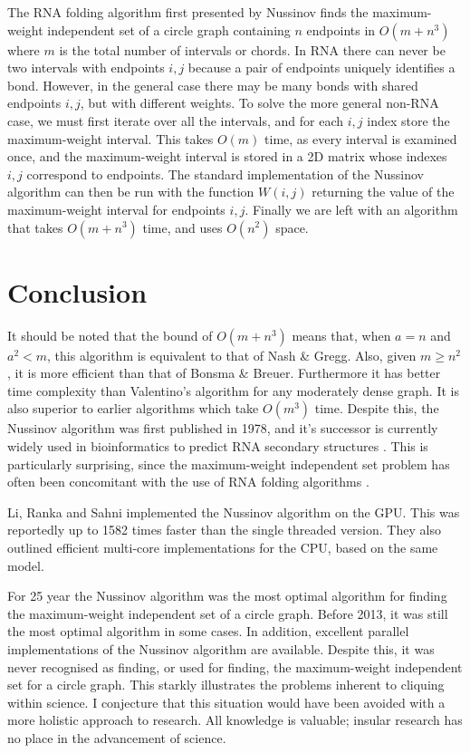 \documentclass[12pt, a4paper]{article}
\begin{document}
The RNA folding algorithm first presented by Nussinov finds the maximum-weight independent set of a circle graph containing $n$ endpoints in $O(m + n^3)$ where $m$ is the total number of intervals or chords. In RNA there can never be two intervals with endpoints $i, j$ because a pair of endpoints uniquely identifies a bond. However, in the general case there may be many bonds with shared endpoints $i, j$, but with different weights. To solve the more general non-RNA case, we must first iterate over all the intervals, and for each $i, j$ index store the maximum-weight interval. This takes $O(m)$ time, as every interval is examined once, and the maximum-weight interval is stored in a 2D matrix whose indexes $i, j$ correspond to endpoints. The standard implementation of the Nussinov algorithm can then be run with the function $W(i, j)$ returning the value of the maximum-weight interval for endpoints $i, j$. Finally we are left with an algorithm that takes $O(m + n^3)$ time, and uses $O(n^2)$ space.


\section*{Conclusion}
It should be noted that the bound of $O(m + n^3)$ means that, when $a = n$ and $a^2 < m$, this algorithm is equivalent to that of Nash \& Gregg. Also, given $m \geq n^2$, it is more efficient than that of Bonsma \& Breuer. Furthermore it has better time complexity than Valentino's algorithm for any moderately dense graph. It is also superior to earlier algorithms which take $O(m^3)$ time. Despite this, the Nussinov algorithm was first published in 1978, and it's successor is currently widely used in bioinformatics to predict RNA secondary structures \cite{lorenz2011viennarna}. This is particularly surprising, since the maximum-weight independent set problem has often been concomitant with the use of RNA folding algorithms \cite{sperschneider2008knotseeker, bon2011tt2ne}.

Li, Ranka and Sahni \cite{li2013multicore} implemented the Nussinov algorithm on the GPU. This was reportedly up to 1582 times faster than the single threaded version. They also outlined efficient multi-core implementations for the CPU, based on the same model.

For 25 year the Nussinov algorithm was the most optimal algorithm for finding the maximum-weight independent set of a circle graph. Before 2013, it was still the most optimal algorithm in some cases. In addition, excellent parallel implementations of the Nussinov algorithm are available. Despite this, it was never recognised as finding, or used for finding, the maximum-weight independent set for a circle graph. This starkly illustrates the problems inherent to cliquing within science. I conjecture that this situation would have been avoided with a more holistic approach to research. All knowledge is valuable; insular research has no place in the advancement of science.




\end{document}
